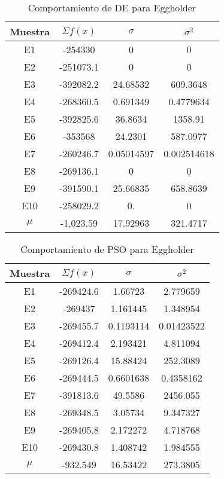 \documentclass[letterpaper,12pt]{article}
\theoremstyle{definition}
\begin{document}
\begin{table}[!h]
  \begin{center}
    \begin{tabular}{cccc}
      \toprule 
        Muestra & \(\Sigma f(x)\) & \(\sigma\)  & \(\sigma^2\)  \\
        \midrule
        \rowcolor{black!20} E1 & -254330 & 0 & 0 \\
        E2 & -251073.1 & 0 & 0 \\
        \rowcolor{black!20} E3 & -392082.2 & 24.68532 & 609.3648\\
        E4 & -268360.5 & 0.691349 & 0.4779634\\
        \rowcolor{black!20} E5 & -392825.6 & 36.8634 & 1358.91 \\
        E6 & -353568 & 24.2301 & 587.0977 \\
        \rowcolor{black!20} E7 & -260246.7 & 0.05014597 & 0.002514618 \\
        E8 & -269136.1 & 0 & 0\\
        \rowcolor{black!20} E9 & -391590.1 & 25.66835 & 658.8639 \\
        E10 & -258029.2 & 0. & 0 \\
        \rowcolor{black!20} \(\mu\) & -1,023.59 & 17.92963 & 321.4717 \\ 
        \bottomrule
      \end{tabular}
  \end{center}
  \caption{Comportamiento de DE para Eggholder}
  \label{tab:de-egg}
\end{table}

\begin{table}[!h]
  \begin{center}
    \begin{tabular}{cccc}
      \toprule 
        Muestra & \(\Sigma f(x)\) & \(\sigma\)  & \(\sigma^2\)  \\
        \midrule
        \rowcolor{black!20} E1 & -269424.6 & 1.66723 & 2.779659 \\
        E2 & -269437 & 1.161445 & 1.348954\\
        \rowcolor{black!20} E3 & -269455.7 & 0.1193114 & 0.01423522\\
        E4 &  -269412.4 & 2.193421 & 4.811094\\
        \rowcolor{black!20} E5 & -269126.4 & 15.88424 & 252.3089 \\
        E6 & -269444.5 & 0.6601638 & 0.4358162 \\
        \rowcolor{black!20} E7 & -391813.6 & 49.5586 & 2456.055 \\
        E8 & -269348.5 & 3.05734 & 9.347327\\
        \rowcolor{black!20} E9 & -269405.8 & 2.172272 & 4.718768 \\
        E10 & -269430.8 & 1.408742 & 1.984555 \\
        \rowcolor{black!20} \(\mu\) & -932.549 & 16.53422 & 273.3805 \\ 
        \bottomrule
      \end{tabular}
  \end{center}
  \caption{Comportamiento de PSO para Eggholder}
  \label{tab:pso-egg}
\end{table}
\end{document}
